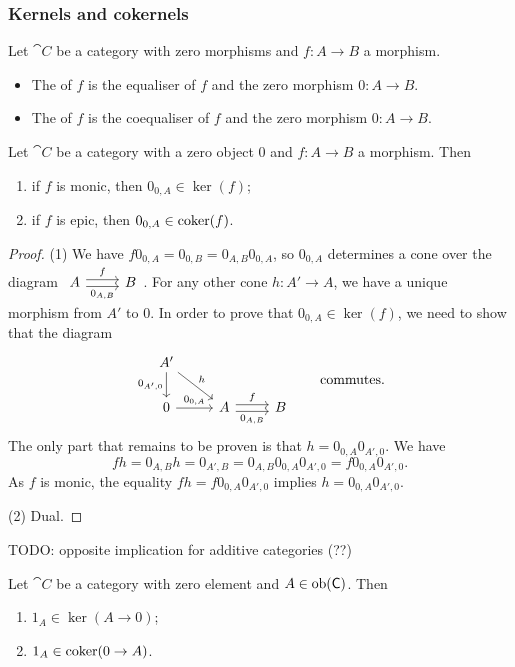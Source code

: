 \subsubsection{Kernels and cokernels}
\begin{definition}
Let $\cat{C}$ be a category with zero morphisms and $f:A\to B$ a morphism.
\begin{itemize}
\item The  of $f$ is the equaliser of $f$ and the zero morphism $0:A\to B$.
\item The  of $f$ is the coequaliser of $f$ and the zero morphism $0:A\to B$.
\end{itemize}
\end{definition}

\begin{proposition} \label{epicMonicZeroKernelCokernel}
Let $\cat{C}$ be a category with a zero object $0$ and $f:A\to B$ a morphism. Then
\begin{enumerate}
\item if $f$ is monic, then $0_{0,A}\in \ker(f)$;
\item if $f$ is epic, then $0_{0,A}\in \operatorname{coker}(f)$.
\end{enumerate}
\end{proposition}
\begin{proof}
(1) We have $f0_{0,A} = 0_{0,B} = 0_{A,B}0_{0,A}$, so $0_{0,A}$ determines a cone over the diagram $\begin{tikzcd}
A \arrow[r, shift left, "f"] \arrow[r, shift right, swap, "{0_{A,B}}"] & B
\end{tikzcd}$. For any other cone $h: A'\to A$, we have a unique morphism from $A'$ to $0$. In order to prove that $0_{0,A}\in\ker(f)$, we need to show that the diagram
\[ \begin{tikzcd}
A' \ar[d, swap, "{0_{A', 0}}"] \ar[dr, "h"] && \\
0 \ar[r, "0_{0,A}"] & A \ar[r, shift left, "f"] \ar[r, shift right, swap, "{0_{A,B}}"] & B
\end{tikzcd}\qquad\text{commutes.} \]
The only part that remains to be proven is that $h = 0_{0,A}0_{A',0}$. We have
\[ fh = 0_{A,B}h = 0_{A',B} = 0_{A,B}0_{0,A}0_{A',0} = f0_{0,A}0_{A',0}. \]
As $f$ is monic, the equality $fh = f0_{0,A}0_{A',0}$ implies $h = 0_{0,A}0_{A',0}$.

(2) Dual.
\end{proof}
TODO: opposite implication for additive categories (??)

\begin{lemma} \label{identityAsKernelCokernel}
Let $\cat{C}$ be a category with zero element and $A\in\operatorname{ob}(\mathsf{C})$. Then
\begin{enumerate}
\item $1_A \in \ker(A\to 0)$;
\item $1_A \in \operatorname{coker}(0\to A)$.
\end{enumerate} 
\end{lemma}

